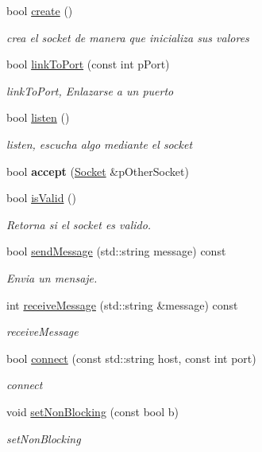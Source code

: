 \begin{DoxyCompactItemize}
\item 
bool \hyperlink{class_socket_a6afde2dca985dacdfa770141192e2daf}{create} ()
\begin{DoxyCompactList}\small\item\em crea el socket de manera que inicializa sus valores \end{DoxyCompactList}\item 
bool \hyperlink{class_socket_a77afe3664d8996221a5d9a08a0330778}{link\-To\-Port} (const int p\-Port)
\begin{DoxyCompactList}\small\item\em link\-To\-Port, Enlazarse a un puerto \end{DoxyCompactList}\item 
bool \hyperlink{class_socket_ac841ace3ba3f3b0daa9b59a498d3769c}{listen} ()
\begin{DoxyCompactList}\small\item\em listen, escucha algo mediante el socket \end{DoxyCompactList}\item 
\hypertarget{class_socket_a0d133d518a86bfae2db9095c587aa4e3}{bool {\bfseries accept} (\hyperlink{class_socket}{Socket} \&p\-Other\-Socket)}\label{class_socket_a0d133d518a86bfae2db9095c587aa4e3}

\item 
bool \hyperlink{class_socket_a5ccaf81da2b6f25dded056e6dbf7f410}{is\-Valid} ()
\begin{DoxyCompactList}\small\item\em Retorna si el socket es valido. \end{DoxyCompactList}\item 
bool \hyperlink{class_socket_a5d4ef6f01022b2653aad96868bd87999}{send\-Message} (std\-::string message) const 
\begin{DoxyCompactList}\small\item\em Envia un mensaje. \end{DoxyCompactList}\item 
int \hyperlink{class_socket_a80aef7d019680c494f45cbd5b7fa37f2}{receive\-Message} (std\-::string \&message) const 
\begin{DoxyCompactList}\small\item\em receive\-Message \end{DoxyCompactList}\item 
bool \hyperlink{class_socket_afe535648cf44461c6ded1b2d72056d47}{connect} (const std\-::string host, const int port)
\begin{DoxyCompactList}\small\item\em connect \end{DoxyCompactList}\item 
void \hyperlink{class_socket_ad97992fa51319cdf4d5d75c8bb49d100}{set\-Non\-Blocking} (const bool b)
\begin{DoxyCompactList}\small\item\em set\-Non\-Blocking \end{DoxyCompactList}\end{DoxyCompactItemize}
